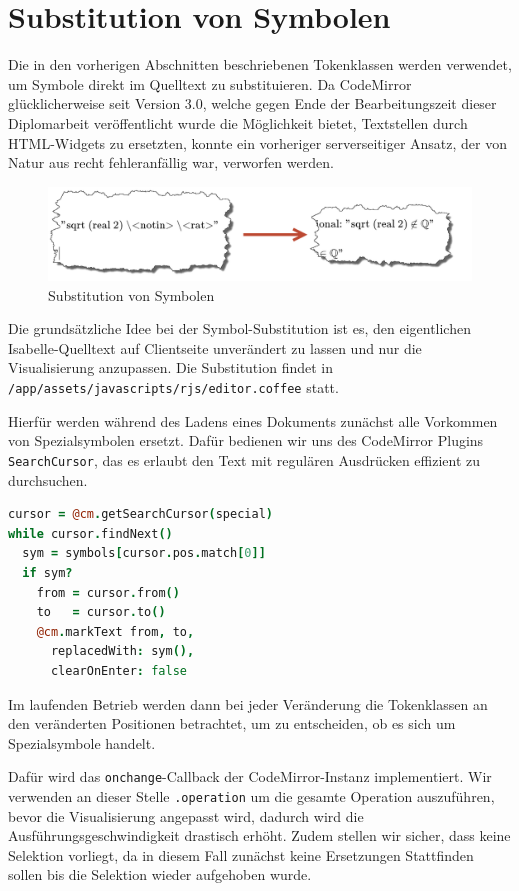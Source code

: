 \section{Substitution von Symbolen}

Die in den vorherigen Abschnitten beschriebenen Tokenklassen werden verwendet, um Symbole direkt im
Quelltext zu substituieren. Da CodeMirror glücklicherweise seit Version 3.0, welche gegen Ende der
Bearbeitungszeit dieser Diplomarbeit veröffentlicht wurde die Möglichkeit bietet, Textstellen durch
HTML-Widgets zu ersetzten, konnte ein vorheriger serverseitiger Ansatz, der von Natur aus recht
fehleranfällig war, verworfen werden.

\begin{figure}[ht]
\includegraphics[width=\linewidth]{images/subst}
  \caption{Substitution von Symbolen}
  \label{fig:subst}
\end{figure}

Die grundsätzliche Idee bei der Symbol-Substitution ist es, den eigentlichen Isabelle-Quelltext auf
Clientseite unverändert zu lassen und nur die Visualisierung anzupassen. Die Substitution findet in
\texttt{/app/assets/javascripts/rjs/editor.coffee} statt.

Hierfür werden während des Ladens eines Dokuments zunächst alle Vorkommen von Spezialsymbolen
ersetzt. Dafür bedienen wir uns des CodeMirror Plugins \texttt{SearchCursor}, das es erlaubt den
Text mit regulären Ausdrücken effizient zu durchsuchen.

\begin{lstlisting}[language=coffee]
cursor = @cm.getSearchCursor(special)
while cursor.findNext()
  sym = symbols[cursor.pos.match[0]]
  if sym?
    from = cursor.from()
    to   = cursor.to()
    @cm.markText from, to,
      replacedWith: sym(),
      clearOnEnter: false    
\end{lstlisting}

Im laufenden Betrieb werden dann bei jeder Veränderung die Tokenklassen an den veränderten
Positionen betrachtet, um zu entscheiden, ob es sich um Spezialsymbole handelt.

Dafür wird das \texttt{onchange}-Callback der CodeMirror-Instanz implementiert. Wir verwenden an
dieser Stelle \texttt{.operation} um die gesamte Operation auszuführen, bevor die Visualisierung
angepasst wird, dadurch wird die Ausführungsgeschwindigkeit drastisch erhöht. Zudem stellen wir
sicher, dass keine Selektion vorliegt, da in diesem Fall zunächst keine Ersetzungen Stattfinden
sollen bis die Selektion wieder aufgehoben wurde.

